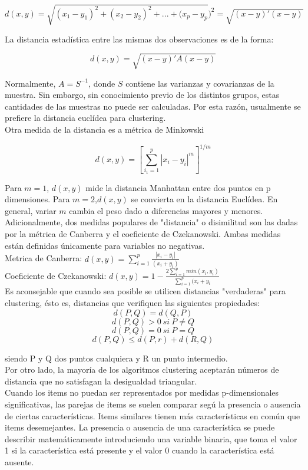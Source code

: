 \documentclass[a4paper, 20pt]{article}
\begin{document}
$$ d(x,y) = \sqrt{(x_1-y_1)^2+(x_2-y_2)^2+...+(x_p-y_p})^2=\sqrt{(x-y)'(x-y)}$$

La distancia estadística entre las mismas dos observaciones es de la forma:

$$d(x,y)=\sqrt{(x-y)'A(x-y)} $$

Normalmente, $A=S^{-1}$, donde $S$ contiene las varianzas y covarianzas de la muestra. Sin embargo, sin conocimiento previo de los distintos grupos, estas cantidades de las muestras no puede ser calculadas. Por esta razón, usualmente se prefiere la distancia euclídea para clustering.\\

Otra medida de la distancia es a métrica de Minkowski

$$ d(x,y)=[\sum_{i_1=1}^{p}{|x_i-y_i|^m}]^{1/m}$$

Para $m=1$, $d(x,y)$ mide la distancia Manhattan entre dos puntos en p dimensiones. Para $m=2$,$d(x,y)$ se convierta en la distancia Euclídea. En general, variar $m$ cambia el peso dado a diferencias mayores y menores.\\

Adicionalmente, dos medidas populares de "distancia" o disimilitud son las dadas por la métrica de Canberra y el coeficiente de Czekanowski. Ambas medidas están definidas únicamente para variables no negativas.\\

Metrica de Canberra:       $ d(x,y)=\sum_{i=1}^{p}{\frac{|x_i-y_i|}{(x_i+y_i)}}$\\

Coeficiente de Czekanowski:   $d(x,y)=1-\frac{2\sum_{i=1}^{p}{min(x_i,y_i)}}{\sum_{i=1}^{p}{(x_i+y_i}}$ \\

Es aconsejable que cuando sea posible se utilicen distancias "verdaderas" para clustering, ésto es, distancias que verifiquen las siguientes propiedades: 
$$d(P,Q)=d(Q,P)$$
$$d(P,Q)>0\ si\ P\neq Q$$
$$d(P,Q)=0\ si\ P=Q$$
$$d(P,Q)\leq d(P,r)+d(R,Q)$$

siendo P y Q dos puntos cualquiera y R un punto intermedio.\\ 

Por otro lado, la mayoría de los algoritmos clustering aceptarán números de distancia que no satisfagan la desigualdad triangular.\\

Cuando los items no puedan ser representados por medidas p-dimensionales significativas, las parejas de items se suelen comparar segú la presencia o ausencia de ciertas características. Items similares tienen más características en común que items desemejantes. La presencia o ausencia de una característica se puede describir matemáticamente introduciendo una variable binaria, que toma el valor 1 si la característica está presente y el valor 0 cuando la característica está ausente. 
\end{document}
